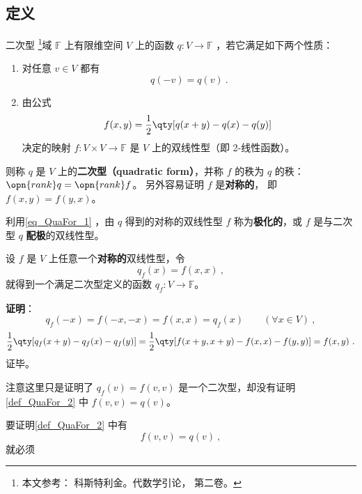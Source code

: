 
\subsection{定义}
\begin{definition}{二次型}\label{def_QuaFor_2}
\footnote{本文参考： 科斯特利金。代数学引论， 第二卷。}域 $\mathbb{F}$ 上有限维空间 $V$ 上的函数 $q:V\rightarrow\mathbb{F}$ ，若它满足如下两个性质：
\begin{enumerate}
\item 对任意 $v\in V$ 都有
\begin{equation}
q(-{v})=q(v)~.
\end{equation}
\item 由公式
\begin{equation}\label{eq_QuaFor_1}
f(x, y)=\frac{1}{2}\qty[q(x+ y)-q(x)-q(y)]~
\end{equation}
决定的映射 $f:V\times V\rightarrow\mathbb{F}$ 是 $V$ 上的双线性型（即 2-线性函数）。
\end{enumerate}
则称 $q$ 是 $V$ 上的\textbf{二次型（quadratic form）}，并称 $f$ 的秩为 $q$ 的秩：$\opn{rank} q = \opn{rank} f$。 另外容易证明 $f$ 是\textbf{对称的}， 即 $f(x,y) = f(y,x)$。
\end{definition}
利用\autoref{eq_QuaFor_1} ，由 $q$ 得到的对称的双线性型 $f$ 称为\textbf{极化的}，或 $f$ 是与二次型 $q$ \textbf{配极}的双线性型。
\begin{example}{}
设 $f$ 是 $V$ 上任意一个\textbf{对称的}双线性型，令
\begin{equation}
q_f( x)=f( x, x)~,
\end{equation}
就得到一个满足二次型定义的函数 $q_f:V\rightarrow\mathbb{F}$。

\textbf{证明}：
\begin{equation}
q_f(-{x})=f(-{x},-{x})=f({x},{x})=q_f({x}) \qquad (\forall x\in V)~,
\end{equation}
\begin{equation}
\frac{1}{2}\qty[q_f(x+ y)-q_f(x)-q_f(y)] = \frac{1}{2}\qty[f( x+ y, x+ y)-f( x, x)-f( y, y)] = f(x, y)~.
\end{equation}
证毕。

注意这里只是证明了 $q_f(v) = f(v,v)$ 是一个二次型，却没有证明\autoref{def_QuaFor_2} 中 $f(v,v) = q(v)$。
\end{example}

要证明\autoref{def_QuaFor_2} 中有
\begin{equation}
f(v, v) = q(v)~,
\end{equation}
就必须

